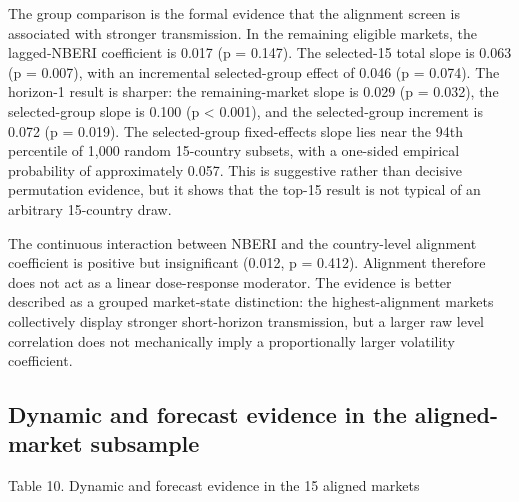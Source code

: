 \documentclass[11pt]{article}
\begin{document}
The group comparison is the formal evidence that the alignment
screen is associated with stronger transmission. In the remaining
eligible markets, the lagged-NBERI coefficient is 0.017 (p = 0.147). The
selected-15 total slope is 0.063 (p = 0.007), with an incremental
selected-group effect of 0.046 (p = 0.074). The horizon-1 result is
sharper: the remaining-market slope is 0.029 (p = 0.032), the
selected-group slope is 0.100 (p \textless{} 0.001), and the
selected-group increment is 0.072 (p = 0.019). The selected-group
fixed-effects slope lies near the 94th percentile of 1,000 random
15-country subsets, with a one-sided empirical probability of
approximately 0.057. This is suggestive rather than decisive permutation
evidence, but it shows that the top-15 result is not typical of an
arbitrary 15-country draw.

The continuous interaction between NBERI and the country-level alignment
coefficient is positive but insignificant (0.012, p = 0.412). Alignment
therefore does not act as a linear dose-response moderator. The evidence
is better described as a grouped market-state distinction: the
highest-alignment markets collectively display stronger short-horizon
transmission, but a larger raw level correlation does not mechanically
imply a proportionally larger volatility coefficient.

\subsection{Dynamic and forecast evidence in the aligned-market
subsample}\label{dynamic-and-forecast-evidence-in-the-aligned-market-subsample}

Table 10. Dynamic and forecast evidence in the 15 aligned markets
\end{document}
